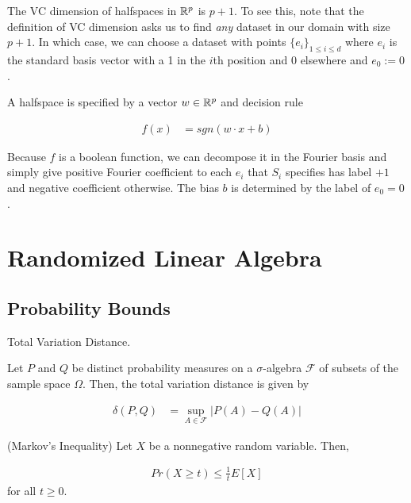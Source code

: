 \documentclass[main.tex]{subfiles}
\begin{document}
\begin{example}
The VC dimension of halfspaces in $\mathbb{R}^p$ is $p+1$. To see this, note that the definition of VC dimension asks us to find \textit{any} dataset in our domain with size $p + 1$. 	In which case, we can choose a dataset with points $\{ e_i \}_{1 \leq i \leq d}$ where $e_i$ is the standard basis vector with a 1 in the $i$th position and 0 elsewhere and $e_0 := 0$. 

A halfspace is specified by a vector $w \in \mathbb{R}^p$ and decision rule 

\begin{align*}
f(x) &= sgn(w \cdot x + b)
\end{align*}
 
Because $f$ is a boolean function, we can decompose it in the Fourier basis and simply give positive Fourier coefficient to each $e_i$ that $S_i$ specifies has label $+1$ and negative coefficient otherwise. The bias $b$ is determined by the label of $e_0 = 0$.
\end{example}

\section{Randomized Linear Algebra}

\subsection{Probability Bounds}

\begin{definition} Total Variation Distance.
\label{def:tve}

Let $P$ and $Q$ be distinct probability measures on a $\sigma$-algebra $\mathcal{F}$ of subsets of the sample space $\Omega$. Then, the total variation distance is given by

\begin{align*}
\delta(P, Q) &= \sup_{A \in \mathcal{F}}\vert P(A) - Q(A)\vert
\end{align*}
\end{definition}

\begin{proposition}(Markov's Inequality)
Let $X$ be a nonnegative random variable. Then, 

\begin{align*}
Pr(X \geq t) \leq \frac{1}{t} E[X]	
\end{align*}
for all $t \geq 0$.
\end{proposition}
\end{document}
